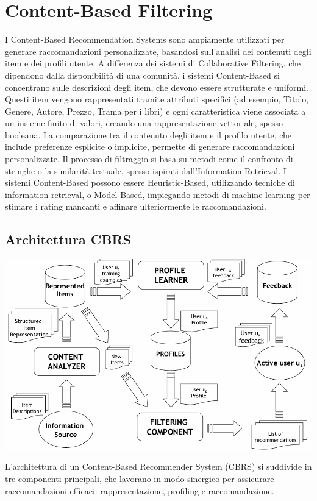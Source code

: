 \documentclass{report}
\begin{document}
	\section{Content-Based Filtering}
	I Content-Based Recommendation Systems sono ampiamente utilizzati per generare raccomandazioni personalizzate, basandosi sull'analisi dei contenuti degli item e dei profili utente. A differenza dei sistemi di Collaborative Filtering, che dipendono dalla disponibilità di una comunità, i sistemi Content-Based si concentrano sulle descrizioni degli item, che devono essere strutturate e uniformi. Questi item vengono rappresentati tramite attributi specifici (ad esempio, Titolo, Genere, Autore, Prezzo, Trama per i libri) e ogni caratteristica viene associata a un insieme finito di valori, creando una rappresentazione vettoriale, spesso booleana. La comparazione tra il contenuto degli item e il profilo utente, che include preferenze esplicite o implicite, permette di generare raccomandazioni personalizzate. Il processo di filtraggio si basa su metodi come il confronto di stringhe o la similarità testuale, spesso ispirati dall'Information Retrieval. I sistemi Content-Based possono essere Heuristic-Based, utilizzando tecniche di information retrieval, o Model-Based, impiegando metodi di machine learning per stimare i rating mancanti e affinare ulteriormente le raccomandazioni.

	\subsection{Architettura CBRS}
	\begin{center}
		\includegraphics[scale=0.4]{assets/cbrs-arch.png}
	\end{center}
	L'architettura di un Content-Based Recommender System (CBRS) si suddivide in tre componenti principali, che lavorano in modo sinergico per assicurare raccomandazioni efficaci: rappresentazione, profiling e raccomandazione.
\end{document}
